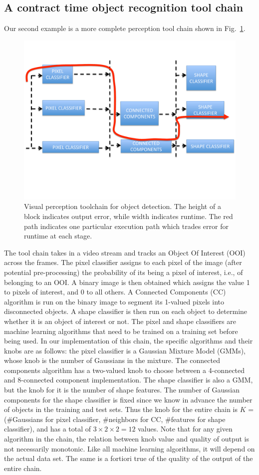 

\subsection{A contract time object recognition tool chain}

Our second example is a more complete perception tool chain shown in Fig.~\ref{fig:chain}.
\begin{figure}[t]
	\centering
	\includegraphics[width=0.7\linewidth]{figures/chain}
	\caption{Visual perception toolchain for object detection. The height of a block indicates output error, while width indicates runtime. The red path indicates one particular execution path which trades error for runtime at each stage.}
	\label{fig:chain}
\end{figure}
The tool chain takes in a video stream and tracks an Object Of Interest (OOI) across the frames.
The pixel classifier assigns to each pixel of the image (after potential pre-processing) the probability of its being a pixel of interest, i.e., of belonging to an OOI. 
A binary image is then obtained which assigns the value 1 to pixels of interest, and 0 to all others. 
A Connected Components (CC) algorithm is run on the binary image to segment its 1-valued pixels into disconnected objects.
A shape classifier is then run on each object to determine whether it is an object of interest or not.
The pixel and shape classifiers are machine learning algorithms that need to be trained on a training set before being used.
In our implementation of this chain, the specific algorithms and their knobs are as follows:
the pixel classifier is a Gaussian Mixture Model (GMMs), whose knob is the number of Gaussians in the mixture.
The connected components algorithm has a two-valued knob to choose between a 4-connected and 8-connected component implementation.
The shape classifier is also a GMM, but the knob for it is the number of shape features.
The number of Gaussian components for the shape classifier is fixed since we know in advance the number of objects in the training and test sets.
Thus the knob for the entire chain is $K$ = (\#Gaussians for pixel classifier, \#neighbors for CC, \#features for shape classifier), and has a total of $3 \times 2 \times 2 = 12$ values.
Note that for any given algorithm in the chain, the relation between knob value and quality of output is not necessarily monotonic. 
Like all machine learning algorithms, it will depend on the actual data set.
The same is a fortiori true of the quality of the output of the entire chain.

